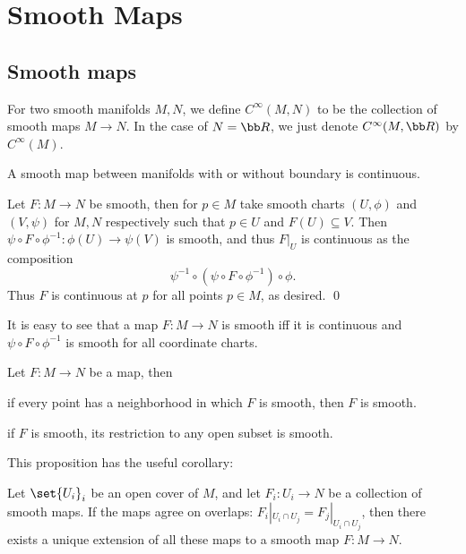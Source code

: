 \section{Smooth Maps}

\subsection{Smooth maps}

\bdefn

    For two smooth manifolds $M,N$, we define $C^\infty(M,N)$ to be the collection of smooth maps $M\to N$.
    In the case of $N=\bR$, we just denote $C^\infty(M,\bR)$ by $C^\infty(M)$.

\edefn

\bprop

    A smooth map between manifolds with or without boundary is continuous.

\eprop

\bproof

    Let $F\colon M\to N$ be smooth, then for $p\in M$ take smooth charts $(U,\phi)$ and $(V,\psi)$ for $M,N$ respectively such that
    $p\in U$ and $F(U)\subseteq V$.
    Then $\psi\circ F\circ\phi^{-1}\colon\phi(U)\to\psi(V)$ is smooth, and thus $F|_U$ is continuous as the composition
    $$ \psi^{-1}\circ(\psi\circ F\circ\phi^{-1})\circ\phi . $$
    Thus $F$ is continuous at $p$ for all points $p\in M$, as desired.
    \qed

\eproof

It is easy to see that a map $F\colon M\to N$ is smooth iff it is continuous and $\psi\circ F\circ\phi^{-1}$ is smooth for all
coordinate charts.

\bprop

    Let $F\colon M\to N$ be a map, then
    \benum
        \item if every point has a neighborhood in which $F$ is smooth, then $F$ is smooth.
        \item if $F$ is smooth, its restriction to any open subset is smooth.
    \eenum

\eprop

This proposition has the useful corollary:

\bcoro

    Let $\set{U_i}_i$ be an open cover of $M$, and let $F_i\colon U_i\to N$ be a collection of smooth maps.
    If the maps agree on overlaps: $F_i|_{U_i\cap U_j}=F_j|_{U_i\cap U_j}$, then there exists a unique extension of all these maps to a smooth map
    $F\colon M\to N$.

